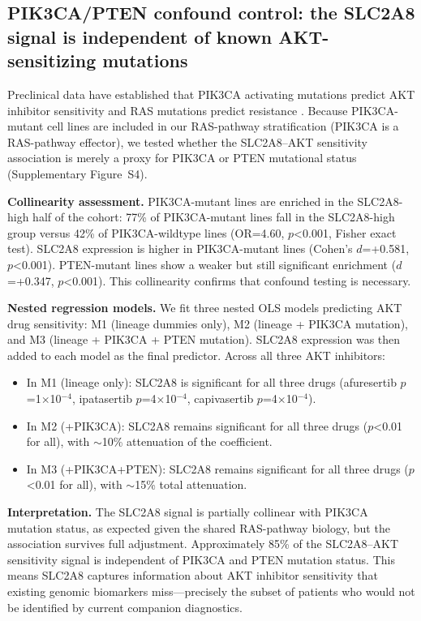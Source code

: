\documentclass[12pt]{article}
\begin{document}
\subsection{PIK3CA/PTEN confound control: the SLC2A8 signal is
independent of known AKT-sensitizing mutations}

Preclinical data have established that PIK3CA activating mutations predict
AKT inhibitor sensitivity and RAS mutations predict resistance
\citep{Davies2012}. Because PIK3CA-mutant cell lines are included in our
RAS-pathway stratification (PIK3CA is a RAS-pathway effector), we tested
whether the SLC2A8--AKT sensitivity association is merely a proxy for
PIK3CA or PTEN mutational status (Supplementary Figure~S4).

\textbf{Collinearity assessment.} PIK3CA-mutant lines are enriched in the
SLC2A8-high half of the cohort: 77\% of PIK3CA-mutant lines fall in the
SLC2A8-high group versus 42\% of PIK3CA-wildtype lines (OR=4.60,
$p$<0.001, Fisher exact test). SLC2A8 expression is higher in
PIK3CA-mutant lines (Cohen's $d$=+0.581, $p$<0.001). PTEN-mutant lines
show a weaker but still significant enrichment ($d$=+0.347, $p$<0.001).
This collinearity confirms that confound testing is necessary.

\textbf{Nested regression models.} We fit three nested OLS models
predicting AKT drug sensitivity: M1 (lineage dummies only), M2
(lineage + PIK3CA mutation), and M3 (lineage + PIK3CA + PTEN mutation).
SLC2A8 expression was then added to each model as the final predictor.
Across all three AKT inhibitors:

\begin{itemize}
  \item In M1 (lineage only): SLC2A8 is significant for all three drugs
    (afuresertib $p$=1$\times$10$^{-4}$, ipatasertib $p$=4$\times$10$^{-4}$, capivasertib $p$=4$\times$10$^{-4}$).
  \item In M2 (+PIK3CA): SLC2A8 remains significant for all three drugs
    ($p$<0.01 for all), with $\sim$10\% attenuation of the coefficient.
  \item In M3 (+PIK3CA+PTEN): SLC2A8 remains significant for all three
    drugs ($p$<0.01 for all), with $\sim$15\% total attenuation.
\end{itemize}

\textbf{Interpretation.} The SLC2A8 signal is partially collinear with
PIK3CA mutation status, as expected given the shared RAS-pathway biology,
but the association survives full adjustment. Approximately 85\% of the
SLC2A8--AKT sensitivity signal is independent of PIK3CA and PTEN mutation
status. This means SLC2A8 captures information about AKT inhibitor
sensitivity that existing genomic biomarkers miss---precisely the subset
of patients who would not be identified by current companion diagnostics.
\end{document}
